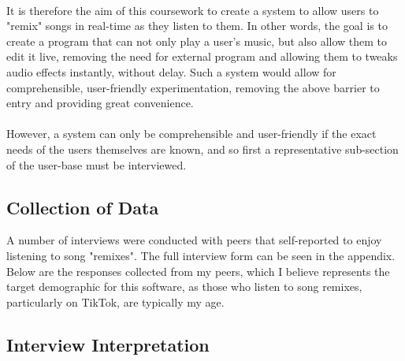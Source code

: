 \paragraph{}
It is therefore the aim of this coursework to create a system to allow users to "remix" songs in real-time as they listen to them. In other words, the goal is to create a program that can not only play a user's music, but also allow them to edit it live, removing the need for external program and allowing them to tweaks audio effects instantly, without delay. Such a system would allow for comprehensible, user-friendly experimentation, removing the above barrier to entry and providing great convenience.

\paragraph{}
However, a system can only be comprehensible and user-friendly if the exact needs of the users themselves are known, and so first a representative sub-section of the user-base must be interviewed.

\pagebreak
\subsection{Collection of Data}
A number of interviews were conducted with peers that self-reported to enjoy listening to song "remixes". The full interview form can be seen in the appendix. Below are the responses collected from my peers, which I believe represents the target demographic for this software, as those who listen to song remixes, particularly on TikTok, are typically my age.



\pagebreak
\subsection{Interview Interpretation}
